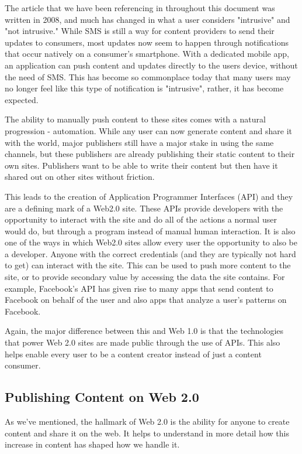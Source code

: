 \documentclass[12pt]{article}
\begin{document}
The article that we have been referencing in throughout this document was written in 2008, and much has changed in what a user considers "intrusive" and "not intrusive."  While SMS is still a way for content providers to send their updates to consumers, most updates now seem to happen through notifications that occur natively on a consumer's smartphone.  With a dedicated mobile app, an application can push content and updates directly to the users device, without the need of SMS.  This has become so commonplace today that many users may no longer feel like this type of notification is "intrusive", rather, it has become expected.

The ability to manually push content to these sites comes with a natural progression - automation.  While any user can now generate content and share it with the world, major publishers still have a major stake in using the same channels, but these publishers are already publishing their static content to their own sites.  Publishers want to be able to write their content but then have it shared out on other sites without friction.

This leads to the creation of Application Programmer Interfaces (API) and they are a defining mark of a Web2.0 site.  These APIs provide developers with the opportunity to interact with the site and do all of the actions a normal user would do, but through a program instead of manual human interaction.  It is also one of the ways in which Web2.0 sites allow every user the opportunity to also be a developer.  Anyone with the correct credentials (and they are typically not hard to get) can interact with the site.  This can be used to push more content to the site, or to provide secondary value by accessing the data the site contains.  For example, Facebook's API has given rise to many apps that send content to Facebook on behalf of the user and also apps that analyze a user's patterns on Facebook.

Again, the major difference between this and Web 1.0 is that the technologies that power Web 2.0 sites are made public through the use of APIs.  This also helps enable every user to be a content creator instead of just a content consumer.

\subsection{Publishing Content on Web 2.0}
As we've mentioned, the hallmark of Web 2.0 is the ability for anyone to create content and share it on the web.  It helps to understand in more detail how this increase in content has shaped how we handle it.
\end{document}
